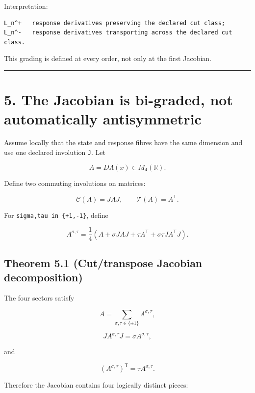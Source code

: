 Interpretation:

\begin{verbatim}
L_n^+   response derivatives preserving the declared cut class;
L_n^-   response derivatives transporting across the declared cut class.
\end{verbatim}

This grading is defined at every order, not only at the first Jacobian.

\begin{center}\rule{0.5\linewidth}{0.5pt}\end{center}

\hypertarget{the-jacobian-is-bi-graded-not-automatically-antisymmetric}{%
\section{5. The Jacobian is bi-graded, not automatically antisymmetric}\label{the-jacobian-is-bi-graded-not-automatically-antisymmetric}}

Assume locally that the state and response fibres have the same dimension and
use one declared involution \texttt{J}. Let

\[
A=D\Lambda(x)\in M_4(\mathbb R).
\]

Define two commuting involutions on matrices:

\[
\mathcal C(A)=JAJ,
\qquad
\mathcal T(A)=A^{\mathsf T}.
\tag{5.1}
\]

For \texttt{sigma,tau\ in\ \{+1,-1\}}, define

\[
\boxed{
A^{\sigma,\tau}
=
\frac14
\left(
A+\sigma JAJ
+\tau A^{\mathsf T}
+\sigma\tau JA^{\mathsf T}J
\right).
}
\tag{5.2}
\]

\hypertarget{theorem-5.1-cuttranspose-jacobian-decomposition}{%
\subsection{Theorem 5.1 (Cut/transpose Jacobian decomposition)}\label{theorem-5.1-cuttranspose-jacobian-decomposition}}

The four sectors satisfy

\[
\boxed{
A=\sum_{\sigma,\tau\in\{\pm1\}}
A^{\sigma,\tau},
}
\tag{5.3}
\]

\[
JA^{\sigma,\tau}J
=\sigma A^{\sigma,\tau},
\tag{5.4}
\]

and

\[
(A^{\sigma,\tau})^{\mathsf T}
=\tau A^{\sigma,\tau}.
\tag{5.5}
\]

Therefore the Jacobian contains four logically distinct pieces:

